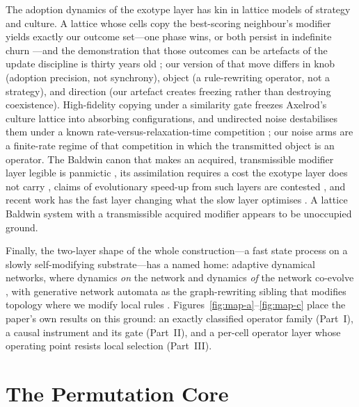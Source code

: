 \documentclass[man,12pt,floatsintext,donotrepeattitle]{apa7}
\begin{document}
The adoption dynamics of the exotype layer has kin in lattice models of
strategy and culture. A lattice whose cells copy the best-scoring
neighbour's modifier yields exactly our outcome set---one phase wins, or
both persist in indefinite churn \parencite{nowak1992spatial}---and the
demonstration that those outcomes can be artefacts of the update discipline
is thirty years old \parencite{huberman1993evolutionary}; our version of
that move differs in knob (adoption precision, not synchrony), object (a
rule-rewriting operator, not a strategy), and direction (our artefact
creates freezing rather than destroying coexistence). High-fidelity copying
under a similarity gate freezes Axelrod's culture lattice into absorbing
configurations, and undirected noise destabilises them under a known
rate-versus-relaxation-time competition
\parencite{axelrod1997dissemination,klemm2003global,carro2016noisy}; our
noise arms are a finite-rate regime of that competition in which the
transmitted object is an operator. The Baldwin canon that makes an
acquired, transmissible modifier layer legible is panmictic
\parencite{hinton1987learning}, its assimilation requires a cost the
exotype layer does not carry \parencite{mayley1996landscapes}, claims of
evolutionary speed-up from such layers are contested
\parencite{santos2015illusion}, and recent work has the fast layer changing
what the slow layer optimises \parencite{shreesha2023competency}. A
lattice Baldwin system with a transmissible acquired modifier appears to be
unoccupied ground.

Finally, the two-layer shape of the whole construction---a fast state
process on a slowly self-modifying substrate---has a named home: adaptive
dynamical networks, where dynamics \emph{on} the network and dynamics
\emph{of} the network co-evolve \parencite{gross2008adaptivereview,berner2023adaptivenetworks},
with generative network automata as the graph-rewriting sibling that
modifies topology where we modify local rules \parencite{sayama2009gna}.
Figures~\ref{fig:map-a}--\ref{fig:map-c} place the paper's own results on
this ground: an
exactly classified operator family (Part~I), a causal instrument and its
gate (Part~II), and a per-cell operator layer whose operating point resists
local selection (Part~III).

\newpage
\part{The Permutation Core}
\end{document}
